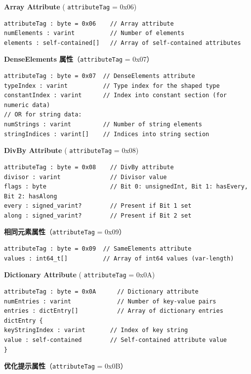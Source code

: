 \documentclass{article}
\begin{document}
\textbf{Array Attribute} ( \texttt{attributeTag} = 0x06)


\begin{lstlisting}
attributeTag : byte = 0x06    // Array attribute
numElements : varint          // Number of elements
elements : self-contained[]   // Array of self-contained attributes
\end{lstlisting}

\textbf{DenseElements 属性}（\texttt{attributeTag} = 0x07）


\begin{lstlisting}
attributeTag : byte = 0x07  // DenseElements attribute
typeIndex : varint          // Type index for the shaped type
constantIndex : varint      // Index into constant section (for numeric data)
// OR for string data:
numStrings : varint         // Number of string elements
stringIndices : varint[]    // Indices into string section
\end{lstlisting}

\textbf{DivBy Attribute} ( \texttt{attributeTag} = 0x08)


\begin{lstlisting}
attributeTag : byte = 0x08    // DivBy attribute
divisor : varint              // Divisor value
flags : byte                  // Bit 0: unsignedInt, Bit 1: hasEvery, Bit 2: hasAlong
every : signed_varint?        // Present if Bit 1 set
along : signed_varint?        // Present if Bit 2 set
\end{lstlisting}

\textbf{相同元素属性}（\texttt{attributeTag} = 0x09）


\begin{lstlisting}
attributeTag : byte = 0x09  // SameElements attribute
values : int64_t[]          // Array of int64 values (var-length)
\end{lstlisting}

\textbf{Dictionary Attribute} ( \texttt{attributeTag} = 0x0A)


\begin{lstlisting}
attributeTag : byte = 0x0A      // Dictionary attribute
numEntries : varint             // Number of key-value pairs
entries : dictEntry[]           // Array of dictionary entries
dictEntry {
keyStringIndex : varint       // Index of key string
value : self-contained        // Self-contained attribute value
}
\end{lstlisting}

\textbf{优化提示属性}（\texttt{attributeTag} = 0x0B）
\end{document}
